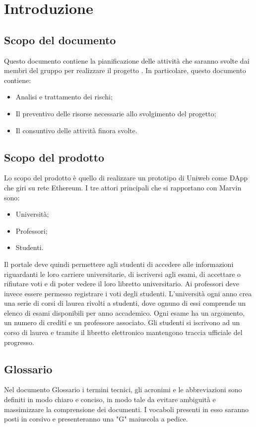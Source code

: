 \newpage
\section{Introduzione}
\subsection{Scopo del documento}
Questo documento contiene la pianificazione delle attività che saranno svolte dai membri del gruppo \Gruppo per realizzare il progetto \NomeProgetto. In particolare, questo documento contiene:

\begin{itemize}
	\item Analisi e trattamento dei rischi;
	\item Il preventivo delle risorse necessarie allo svolgimento del progetto;
	\item Il consuntivo delle attività finora svolte.
\end{itemize}

\subsection{Scopo del prodotto}
Lo scopo del prodotto è quello di realizzare un prototipo di Uniweb come ÐApp che giri su rete Ethereum. I tre attori principali che si rapportano con Marvin sono:
\begin{itemize}
	\item Università;
	\item Professori;
	\item Studenti.
\end{itemize} 
Il portale deve quindi permettere agli studenti di accedere alle informazioni riguardanti le loro carriere universitarie, di iscriversi agli esami, di accettare o rifiutare voti e di poter vedere il loro libretto universitario.
Ai professori deve invece essere permesso registrare i voti degli studenti.
L'università ogni anno crea una serie di corsi di laurea rivolti a studenti, dove ognuno di essi comprende un elenco di esami disponibili per anno accademico. Ogni esame ha un argomento, un numero di crediti e un professore associato. Gli studenti si iscrivono ad un corso di laurea e tramite il libretto elettronico mantengono traccia ufficiale del progresso.

\subsection{Glossario}
Nel documento Glossario i termini tecnici, gli acronimi e le abbreviazioni sono definiti in modo chiaro e conciso, in modo tale da evitare ambiguità e massimizzare la comprensione dei documenti.
\newline I vocaboli presenti in esso saranno posti in corsivo e presenteranno una "G" maiuscola a pedice.

